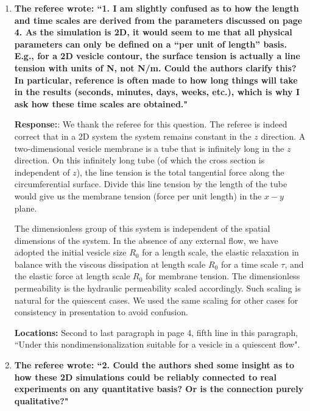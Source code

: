 \documentclass[12pt]{article}
\begin{document}
\begin{enumerate}

\item {\bf The referee wrote: ``1. I am slightly confused as to how the length and time scales are derived from the parameters discussed on page 4. As the simulation is 2D, it would seem to me that all physical parameters can only be defined on a “per unit of length” basis. E.g., for a 2D vesicle contour, the surface tension is actually a line tension with units of N, not N/m. Could the authors clarify this?
In particular, reference is often made to how long things will take in the results (seconds,
minutes, days, weeks, etc.), which is why I ask how these time scales are obtained."}

\noindent
{\bf Response:}: We thank the referee for this question. The referee is indeed correct that in a 2D system the system remains constant in the $z$ direction. A two-dimensional vesicle membrane is a tube that is infinitely long in the $z$ direction.
On this infinitely long tube (of which the cross section is independent of $z$), the line tension is the total tangential force along the circumferential surface. Divide this line tension by the length of the tube would give us the membrane tension (force per unit length) in the $x-y$ plane.  
%

The dimensionless group of this system is independent of the spatial dimensions of the system. In the absence of any external flow, we have adopted the initial vesicle size $R_0$ for a length scale,  the elastic relaxation in balance with the viscous dissipation at  length scale $R_0$ for a time scale $\tau$, and the elastic force at length scale $R_0$ for membrane tension. The dimensionless permeability is the hydraulic permeability scaled accordingly. Such scaling is natural for the quiescent cases. We used the same scaling for other cases for consistency in presentation to avoid confusion.

\noindent
{\bf Locations:} Second to last paragraph in page 4, fifth line in this paragraph, ``Under this nondimensionalization suitable for a vesicle in a quiescent flow".


\item {\bf The referee wrote: ``2. Could the authors shed some insight as to how these 2D simulations could be reliably connected to real experiments on any quantitative basis? Or is the connection purely
qualitative?"}


\end{enumerate}
\end{document}
